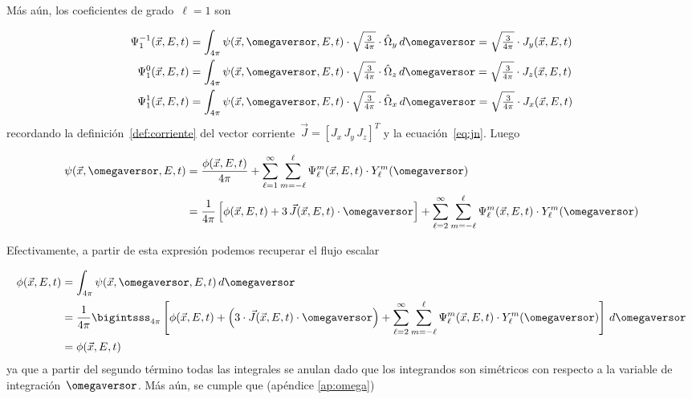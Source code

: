\medskip

Más aún, los coeficientes de grado~$\ell=1$ son

\begin{align*}
 \Psi_1^{-1}(\vec{x}, E, t) &= \int_{4\pi} \psi(\vec{x}, \omegaversor, E,t) \cdot \textstyle \sqrt{\frac{3}{4\pi}} \cdot \hat{\Omega}_y \, d\omegaversor = \sqrt{\frac{3}{4\pi}} \cdot J_y(\vec{x}, E, t) \\
 \Psi_1^{0}(\vec{x}, E, t) &= \int_{4\pi} \psi(\vec{x}, \omegaversor, E,t) \cdot \textstyle \sqrt{\frac{3}{4\pi}} \cdot \hat{\Omega}_z \, d\omegaversor = \sqrt{\frac{3}{4\pi}} \cdot J_z(\vec{x}, E, t) \\
 \Psi_1^{1}(\vec{x}, E, t) &= \int_{4\pi} \psi(\vec{x}, \omegaversor, E,t) \cdot \textstyle \sqrt{\frac{3}{4\pi}} \cdot \hat{\Omega}_x \, d\omegaversor = \sqrt{\frac{3}{4\pi}} \cdot J_x(\vec{x}, E, t) \\
\end{align*}
%
recordando la definición~\ref{def:corriente} del vector corriente~$\vec{J} = [J_x \, J_y \,J_z]^T$ y la ecuación~\eqref{eq:jn}. Luego

\begin{align}\label{eq:psi1}
\psi(\vec{x}, \omegaversor, E, t) &= \frac{\phi(\vec{x}, E, t)}{4\pi} + \sum_{\ell=1}^{\infty} \sum_{m=-\ell}^{\ell} \Psi_\ell^m (\vec{x}, E, t) \cdot Y_{\ell}^{m} ({\omegaversor}) \nonumber \\
&= \frac{1}{4\pi} \left [ \phi(\vec{x}, E, t) + 3 \, \vec{J}(\vec{x}, E, t) \cdot \omegaversor \right] + \sum_{\ell=2}^{\infty} \sum_{m=-\ell}^{\ell} \Psi_\ell^m (\vec{x}, E, t) \cdot Y_{\ell}^{m} ({\omegaversor})
\end{align}

Efectivamente, a partir de esta expresión podemos recuperar el flujo escalar

\begin{align*}
 \phi(\vec{x},E,t) &= \int_{4\pi} \psi(\vec{x}, \omegaversor, E, t) \, d\omegaversor\\
&= \frac{1}{4\pi} \bigintsss_{4\pi} \left[ \phi(\vec{x},E,t) + \left( 3\cdot \vec{J}(\vec{x},E,t) \cdot \omegaversor \right) + \sum_{\ell=2}^{\infty} \sum_{m=-\ell}^{\ell} \Psi_\ell^m (\vec{x}, E, t) \cdot Y_{\ell}^{m} ({\omegaversor}) \right] \, d\omegaversor \\
&= \phi(\vec{x},E,t)
\end{align*}
%
ya que a partir del segundo término todas las integrales se anulan dado que los integrandos son simétricos con respecto a la variable de integración~$\omegaversor$. Más aún, se cumple que (apéndice \ref{ap:omega})

